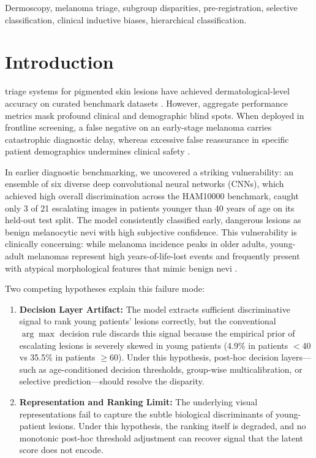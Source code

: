 \documentclass[journal]{IEEEtran}
\begin{document}
\begin{abstract}
\end{abstract}

\begin{IEEEkeywords}
Dermoscopy, melanoma triage, subgroup disparities, pre-registration, selective classification, clinical inductive biases, hierarchical classification.
\end{IEEEkeywords}

\section{Introduction}

 triage systems for pigmented skin lesions have achieved dermatological-level accuracy on curated benchmark datasets \cite{tschandl2018ham10000,codella2018isic,esteva2017dermatologist}. However, aggregate performance metrics mask profound clinical and demographic blind spots. When deployed in frontline screening, a false negative on an early-stage melanoma carries catastrophic diagnostic delay, whereas excessive false reassurance in specific patient demographics undermines clinical safety \cite{adamson2018machine}.

In earlier diagnostic benchmarking, we uncovered a striking vulnerability: an ensemble of six diverse deep convolutional neural networks (CNNs), which achieved high overall discrimination across the HAM10000 benchmark, caught only 3 of 21 escalating images in patients younger than 40 years of age on its held-out test split. The model consistently classified early, dangerous lesions as benign melanocytic nevi with high subjective confidence. This vulnerability is clinically concerning: while melanoma incidence peaks in older adults, young-adult melanomas represent high years-of-life-lost events and frequently present with atypical morphological features that mimic benign nevi \cite{marghoob2021dermoscopy}.

Two competing hypotheses explain this failure mode:
\begin{enumerate}
\item \textbf{Decision Layer Artifact:} The model extracts sufficient discriminative signal to rank young patients' lesions correctly, but the conventional $\arg\max$ decision rule discards this signal because the empirical prior of escalating lesions is severely skewed in young patients (4.9\% in patients $<$40 vs 35.5\% in patients $\ge$60). Under this hypothesis, post-hoc decision layers---such as age-conditioned decision thresholds, group-wise multicalibration, or selective prediction---should resolve the disparity.
\item \textbf{Representation and Ranking Limit:} The underlying visual representations fail to capture the subtle biological discriminants of young-patient lesions. Under this hypothesis, the ranking itself is degraded, and no monotonic post-hoc threshold adjustment can recover signal that the latent score does not encode.
\end{enumerate}
\end{document}
